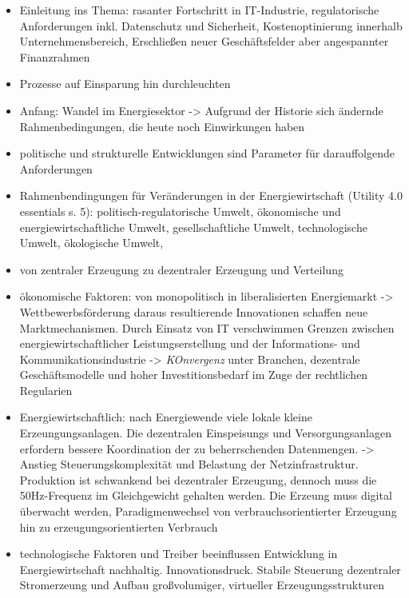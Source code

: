 \begin{itemize}
  \item Einleitung ins Thema: rasanter Fortschritt in IT-Industrie, regulatorische Anforderungen inkl. Datenschutz und Sicherheit, Kostenoptinierung innerhalb Unternehmensbereich, Erschließen neuer Geschäftsfelder aber angespannter Finanzrahmen
  \item Prozesse auf Einsparung hin durchleuchten
  \item Anfang: Wandel im Energiesektor -> Aufgrund der Historie sich ändernde Rahmenbedingungen, die heute noch Einwirkungen haben
  \item politische und strukturelle Entwicklungen sind Parameter für darauffolgende Anforderungen
  \item Rahmenbendingungen für Veränderungen in der Energiewirtschaft (Utility 4.0 essentials s. 5): politisch-regulatorische Umwelt, ökonomische und energiewirtschaftliche Umwelt, gesellschaftliche Umwelt, technologische Umwelt, ökologische Umwelt,

  \item von zentraler Erzeugung zu dezentraler Erzeugung und Verteilung
  \item ökonomische Faktoren: von monopolitisch in liberalisierten Energiemarkt  -> Wettbewerbsförderung daraus resultierende Innovationen schaffen neue Marktmechanismen. Durch Einsatz von IT verschwimmen Grenzen zwischen energiewirtschaftlicher Leistungserstellung und der Informations- und Kommunikationsindustrie -> \textit{KOnvergenz} unter Branchen, dezentrale Geschäftsmodelle und hoher Investitionsbedarf im Zuge der rechtlichen Regularien
  \item Energiewirtschaftlich: nach Energiewende viele lokale kleine Erzeungungsanlagen. Die dezentralen Einspeisungs und Versorgungsanlagen erfordern bessere Koordination der zu beherrschenden Datenmengen. -> Anstieg Steuerungskomplexität und Belastung der Netzinfrastruktur. Produktion ist schwankend bei dezentraler Erzeugung, dennoch muss die 50Hz-Frequenz im Gleichgewicht gehalten werden. Die Erzeung muss digital überwacht werden, Paradigmenwechsel von verbrauchsorientierter Erzeugung hin zu erzeugungsorientierten Verbrauch

  \item technologische Faktoren und Treiber beeinflussen Entwicklung in Energiewirtschaft nachhaltig. Innovationsdruck. Stabile Steuerung dezentraler Stromerzeung und Aufbau großvolumiger, virtueller Erzeugungsstrukturen
\end{itemize}


